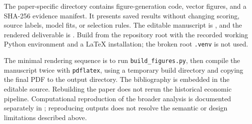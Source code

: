 The paper-specific directory  contains figure-generation code, vector figures, and a SHA-256 evidence manifest. It presents saved results without changing scoring, source labels, model fits, or selection rules. The editable manuscript is , and the rendered deliverable is . Build from the repository root with the recorded working Python environment and a LaTeX installation; the broken root \texttt{.venv} is not used.

The minimal rendering sequence is to run \texttt{build\_figures.py}, then compile the manuscript twice with \texttt{pdflatex}, using a temporary build directory and copying the final PDF to the output directory. The bibliography is embedded in the editable source. Rebuilding the paper does not rerun the historical economic pipeline. Computational reproduction of the broader analysis is documented separately in ; reproducing outputs does not resolve the semantic or design limitations described above.

